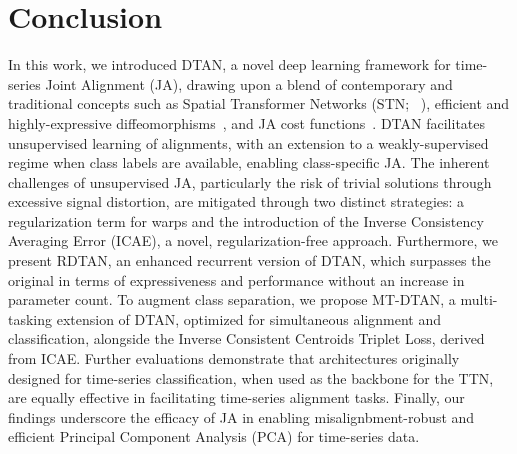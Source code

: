 \section{Conclusion}\label{Sec:Conclusion}
In this work, we introduced DTAN, a novel deep learning framework for time-series Joint Alignment (JA), drawing upon a blend of contemporary and traditional concepts such as Spatial Transformer Networks (STN; ~\cite{Jaderberg:NIPS:2015:spatial,Skafte:CVPR:2018:DDTN}), efficient and highly-expressive diffeomorphisms~\cite{Freifeld:ICCV:2015:CPAB,Freifeld:PAMI:2017:CPAB}, and JA cost functions~\cite{Learned:PAMI:2006:align,Cox:CVPR:2008:LS,Erez:2022:ECCV:MCBM,Barel:ECCV:2024:spacejam}. DTAN facilitates unsupervised learning of alignments, with an extension to a weakly-supervised regime when class labels are available, enabling class-specific JA. The inherent challenges of unsupervised JA, particularly the risk of trivial solutions through excessive signal distortion, are mitigated through two distinct strategies: a regularization term for warps and the introduction of the Inverse Consistency Averaging Error (ICAE), a novel, regularization-free approach. Furthermore, we present RDTAN, an enhanced recurrent version of DTAN, which surpasses the original in terms of expressiveness and performance without an increase in parameter count. To augment class separation, we propose MT-DTAN, a multi-tasking extension of DTAN, optimized for simultaneous alignment and classification, alongside the Inverse Consistent Centroids Triplet Loss, derived from ICAE. Further evaluations demonstrate that architectures originally designed for time-series classification, when used as the backbone for the TTN, are equally effective in facilitating time-series alignment tasks. 
Finally, our findings underscore the efficacy of JA in enabling misalignbment-robust and efficient Principal Component Analysis (PCA) for time-series data.
